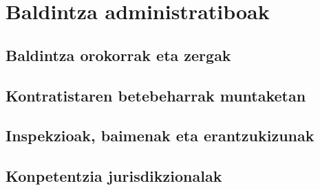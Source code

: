 %

\section{Baldintza administratiboak}

\subsection{Baldintza orokorrak eta zergak}

\subsection{Kontratistaren betebeharrak muntaketan}

\subsection{Inspekzioak, baimenak eta erantzukizunak}

\subsection{Konpetentzia jurisdikzionalak}
